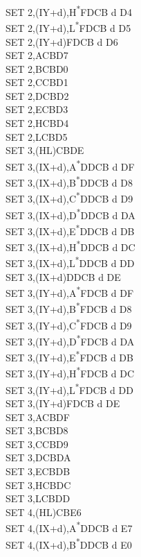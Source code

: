 \documentclass[oneside,a4paper]{book}
\begin{document}
\begin{multicols}{3}
{\begin{tabbing}
SET 2,(IY+d),H\textsuperscript{*}\>FDCB d D4\\
SET 2,(IY+d),L\textsuperscript{*}\>FDCB d D5\\
SET 2,(IY+d)\>FDCB d D6\\
SET 2,A\>CBD7\\
SET 2,B\>CBD0\\
SET 2,C\>CBD1\\
SET 2,D\>CBD2\\
SET 2,E\>CBD3\\
SET 2,H\>CBD4\\
SET 2,L\>CBD5\\
SET 3,(HL)\>CBDE\\
SET 3,(IX+d),A\textsuperscript{*}\>DDCB d DF\\
SET 3,(IX+d),B\textsuperscript{*}\>DDCB d D8\\
SET 3,(IX+d),C\textsuperscript{*}\>DDCB d D9\\
SET 3,(IX+d),D\textsuperscript{*}\>DDCB d DA\\
SET 3,(IX+d),E\textsuperscript{*}\>DDCB d DB\\
SET 3,(IX+d),H\textsuperscript{*}\>DDCB d DC\\
SET 3,(IX+d),L\textsuperscript{*}\>DDCB d DD\\
SET 3,(IX+d)\>DDCB d DE\\
SET 3,(IY+d),A\textsuperscript{*}\>FDCB d DF\\
SET 3,(IY+d),B\textsuperscript{*}\>FDCB d D8\\
SET 3,(IY+d),C\textsuperscript{*}\>FDCB d D9\\
SET 3,(IY+d),D\textsuperscript{*}\>FDCB d DA\\
SET 3,(IY+d),E\textsuperscript{*}\>FDCB d DB\\
SET 3,(IY+d),H\textsuperscript{*}\>FDCB d DC\\
SET 3,(IY+d),L\textsuperscript{*}\>FDCB d DD\\
SET 3,(IY+d)\>FDCB d DE\\
SET 3,A\>CBDF\\
SET 3,B\>CBD8\\
SET 3,C\>CBD9\\
SET 3,D\>CBDA\\
SET 3,E\>CBDB\\
SET 3,H\>CBDC\\
SET 3,L\>CBDD\\
SET 4,(HL)\>CBE6\\
SET 4,(IX+d),A\textsuperscript{*}\>DDCB d E7\\
SET 4,(IX+d),B\textsuperscript{*}\>DDCB d E0\\

\end{tabbing}}
\end{multicols}
\end{document}
